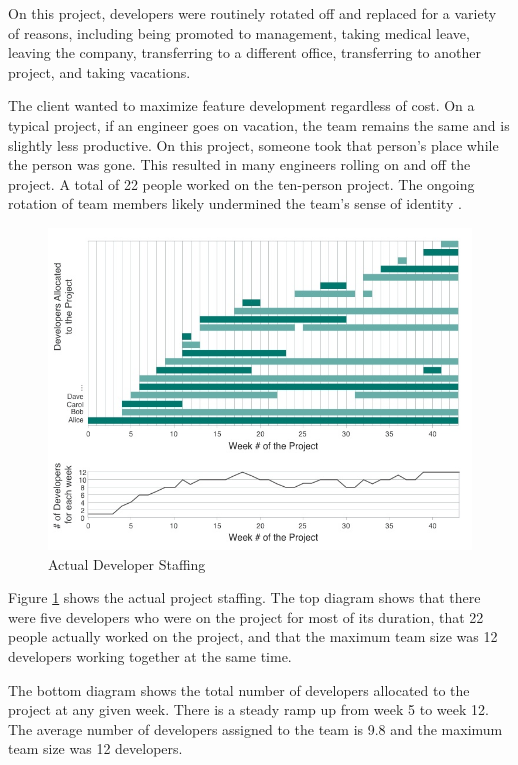 On this project, developers were routinely rotated off and replaced for a variety of reasons, including being promoted to management, taking medical leave, leaving the company, transferring to a different office, transferring to another project, and taking vacations. 

The client wanted to maximize feature development regardless of cost. On a typical project, if an engineer goes on vacation, the team remains the same and is slightly less productive. On this project, someone took that person's place while the person was gone. This resulted in many engineers rolling on and off the project. A total of 22 people worked on the ten-person project. The ongoing rotation of team members likely undermined the team's sense of identity \cite{TuckmanModel}.

\begin{figure}[t]
\centering
\includegraphics[width=7.1in]{DeveloperStaffing.jpg}
\caption{Actual Developer Staffing}
\label{DeveloperStaffing}
\end{figure}

Figure \ref{DeveloperStaffing} shows the actual project staffing.  The top diagram shows that there were five developers who were on the project for most of its duration, that 22 people actually worked on the project, and that the maximum team size was 12 developers working together at the same time.

The bottom diagram shows the total number of developers allocated to the project at any given week. There is a steady ramp up from week 5 to week 12. The average number of developers assigned to the team is 9.8 and the maximum team size was 12 developers.

